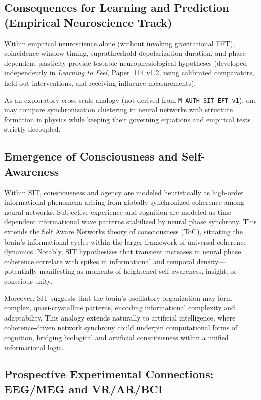 \subsection*{Consequences for Learning and Prediction (Empirical Neuroscience Track)}

Within empirical neuroscience alone (without invoking gravitational EFT), coincidence-window timing, suprathreshold depolarization duration, and phase-dependent plasticity provide testable neurophysiological hypotheses (developed independently in \emph{Learning to Feel}, Paper~114 v1.2, using calibrated comparators, held-out interventions, and receiving-influence measurements).

As an exploratory cross-scale analogy (not derived from \texttt{M\_AUTH\_SIT\_EFT\_v1}), one may compare synchronization clustering in neural networks with structure formation in physics while keeping their governing equations and empirical tests strictly decoupled.

\subsection{Emergence of Consciousness and Self-Awareness}

Within SIT, consciousness and agency are modeled heuristically as high-order informational phenomena arising from globally synchronized coherence among neural networks. Subjective experience and cognition are modeled as time-dependent informational wave patterns stabilized by neural phase synchrony. This extends the Self Aware Networks theory of consciousness (ToC), situating the brain's informational cycles within the larger framework of universal coherence dynamics. Notably, SIT hypothesizes that transient increases in neural phase coherence correlate with spikes in informational and temporal density---potentially manifesting as moments of heightened self-awareness, insight, or conscious unity.

Moreover, SIT suggests that the brain's oscillatory organization may form complex, quasi-crystalline patterns, encoding informational complexity and adaptability. This analogy extends naturally to artificial intelligence, where coherence-driven network synchrony could underpin computational forms of cognition, bridging biological and artificial consciousness within a unified informational logic.

\subsection{Prospective Experimental Connections: EEG/MEG and VR/AR/BCI}

